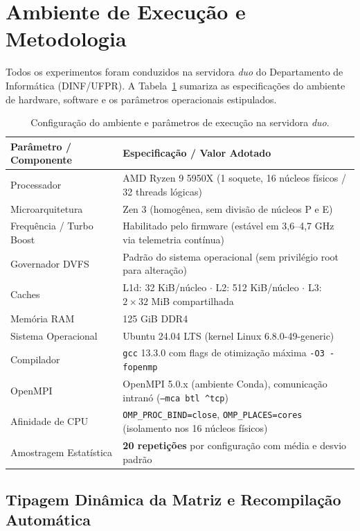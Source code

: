 \section{Ambiente de Execução e Metodologia}
\label{sec:ambiente}

Todos os experimentos foram conduzidos na servidora \textit{duo} do Departamento de Informática (DINF/UFPR). A Tabela~\ref{tab:cpu} sumariza as especificações do ambiente de hardware, software e os parâmetros operacionais estipulados.

\begin{table}[H]
\centering
\small
\caption{Configuração do ambiente e parâmetros de execução na servidora \textit{duo}.}
\label{tab:cpu}
\begin{tabular}{@{}ll@{}}
\toprule
\textbf{Parâmetro / Componente} & \textbf{Especificação / Valor Adotado} \\ \midrule
Processador & AMD Ryzen 9 5950X (1 soquete, 16 núcleos físicos / 32 threads lógicas) \\
Microarquitetura & Zen 3 (homogênea, sem divisão de núcleos P e E) \\
Frequência / Turbo Boost & Habilitado pelo firmware (estável em 3{,}6--4{,}7 GHz via telemetria contínua) \\
Governador DVFS & Padrão do sistema operacional (sem privilégio root para alteração) \\
Caches & L1d: 32 KiB/núcleo $\cdot$ L2: 512 KiB/núcleo $\cdot$ L3: $2 \times 32$ MiB compartilhada \\
Memória RAM & 125 GiB DDR4 \\
Sistema Operacional & Ubuntu 24.04 LTS (kernel Linux 6.8.0-49-generic) \\
Compilador & \texttt{gcc} 13.3.0 com flags de otimização máxima \texttt{-O3 -fopenmp} \\
OpenMPI & OpenMPI 5.0.x (ambiente Conda), comunicação intranó (\texttt{--mca btl \^{}tcp}) \\
Afinidade de CPU & \texttt{OMP\_PROC\_BIND=close}, \texttt{OMP\_PLACES=cores} (isolamento nos 16 núcleos físicos) \\
Amostragem Estatística & \textbf{20 repetições} por configuração com média e desvio padrão \\ \bottomrule
\end{tabular}
\end{table}

\subsection{Tipagem Dinâmica da Matriz e Recompilação Automática}
\label{sec:tipagem}

